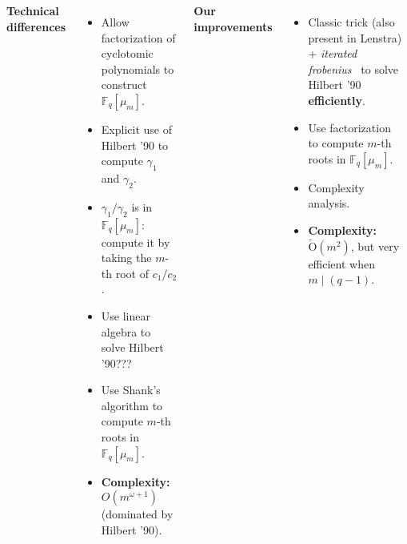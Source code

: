 \documentclass[20pt,landscape,a0paper]{tikzposter}
\def\F {\ensuremath{\mathbb{F}}}
\def\tildO {\ensuremath{\mathrm{\tilde{O}}}}
\renewcommand{\paragraph}[1]{\smallskip\textbf{#1}}
\begin{document}
\begin{columns}
{    \paragraph{Technical differences}
    \begin{itemize}
    \item Allow factorization of cyclotomic polynomials to construct
      $\F_q[\mu_m]$.
    \item Explicit use of Hilbert '90 to compute $\gamma_1$ and
      $\gamma_2$.
    \item $\gamma_1/\gamma_2$ is in $\F_q[\mu_m]$: compute it by
      taking the $m$-th root of $c_1/c_2$.
    \item \textcolor{alert}{Use linear algebra to solve Hilbert
        '90???}
    \item Use Shank's algorithm to compute $m$-th roots in
      $\F_q[\mu_m]$.
    \item \textbf{Complexity:} $O\left(m^{\omega+1}\right)$ (dominated
      by Hilbert '90).
    \end{itemize}

    \paragraph{Our improvements}
    \begin{itemize}
    \item Classic trick (also present in Lenstra) + \emph{iterated
        frobenius}~\cite{vzgathen+shoup92:journal} to solve Hilbert
      '90 \textbf{efficiently}.
    \item Use factorization~\cite{kaltofen+shoup97} to compute $m$-th
      roots in $\F_q[\mu_m]$.
    \item \textcolor{alert}{Complexity analysis. \Large\Smiley}
    \item \textbf{Complexity:} $\tildO(m^2)$, but very efficient when
      $m\mid(q-1)$.
    \end{itemize}
  }



\end{columns}
\end{document}
